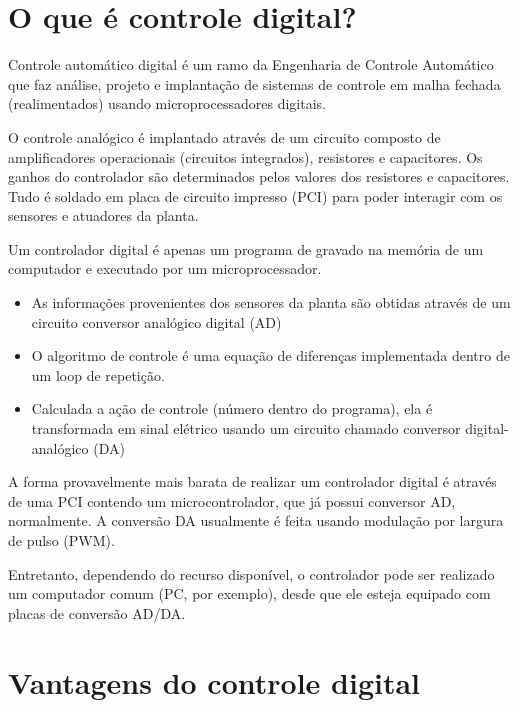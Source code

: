 \documentclass[12pt, a4paper]{article}
\title{}
\date{\today}
\begin{document}
\maketitle

\section{O que é controle digital?}

Controle automático digital é um ramo da Engenharia de Controle Automático que faz análise, projeto e implantação de sistemas de controle em malha fechada (realimentados) usando microprocessadores digitais.

O controle analógico é implantado através de um circuito composto de amplificadores operacionais (circuitos integrados), resistores e capacitores. Os ganhos do controlador são determinados pelos valores dos resistores e capacitores. Tudo é soldado em placa de circuito impresso (PCI) para poder interagir com os sensores e atuadores da planta. 

Um controlador digital é apenas um programa de gravado na memória de um computador e executado por um microprocessador. 
\begin{itemize}
	\item As informações provenientes dos sensores da planta são obtidas através de um circuito conversor analógico digital (AD)
	\item O algoritmo de controle é uma equação de diferenças implementada dentro de um loop de repetição.
	\item Calculada a ação de controle (número dentro do programa), ela é transformada em sinal elétrico usando um circuito chamado conversor digital-analógico (DA)
\end{itemize}
	
A forma provavelmente mais barata de realizar um controlador digital é através de uma PCI contendo um microcontrolador, que já possui conversor AD, normalmente. A conversão DA usualmente é feita usando modulação por largura de pulso (PWM).

Entretanto, dependendo do recurso disponível, o controlador pode ser realizado um computador comum (PC, por exemplo), desde que ele esteja equipado com placas de conversão AD/DA. 

\section{Vantagens do controle digital}
\end{document}
